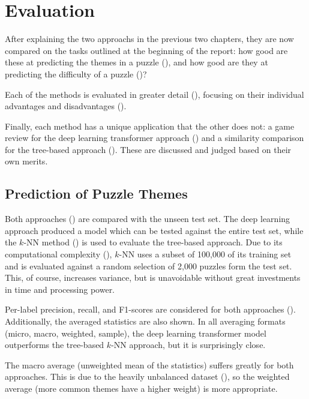 \chapter{Evaluation}\label{evalChapter}

After explaining the two approachs in the previous two chapters, they are now
compared on the tasks outlined at the beginning of the report: how good are
these at predicting the themes in a puzzle (), and how good are
they at predicting the difficulty of a puzzle ()?

Each of the methods is evaluated in greater detail (),
focusing on their individual advantages and disadvantages
().

Finally, each method has a unique application that the other does not: a game
review for the deep learning transformer approach () and a
similarity comparison for the tree-based approach (). These are
discussed and judged based on their own merits.


\section{Prediction of Puzzle Themes}\label{evalS1}

Both approaches () are compared with the unseen test
set. The deep learning approach produced a model which can be tested against
the entire test set, while the $k$-NN method () is used to
evaluate the tree-based approach. Due to its computational complexity
(), $k$-NN uses a subset of 100,000 of its training set and is
evaluated against a random selection of 2,000 puzzles form the test set. This,
of course, increases variance, but is unavoidable without great investments in
time and processing power.

Per-label precision, recall, and F1-scores are considered for both approaches
(). Additionally, the averaged statistics are also shown. In
all averaging formats (micro, macro, weighted, sample), the deep learning
transformer model outperforms the tree-based $k$-NN approach, but it is
surprisingly close. 

The macro average (unweighted mean of the statistics) suffers greatly for both
approaches. This is due to the heavily unbalanced dataset
(), so the weighted average (more common themes have a
higher weight) is more appropriate.

